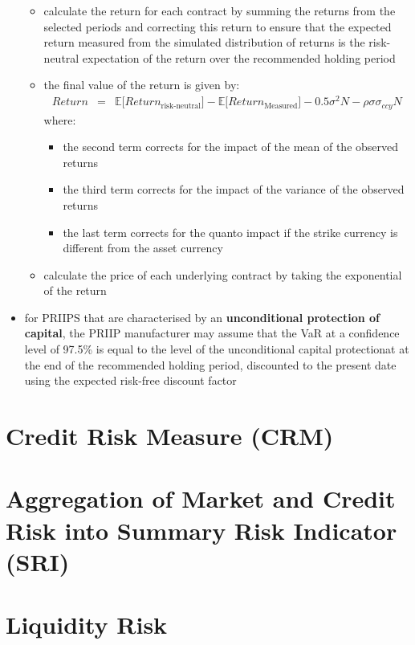 \begin{itemize}
\begin{itemize}
		\item calculate the return for each contract by summing the returns from the selected periods and correcting this return to ensure that the expected return measured from the simulated distribution of returns is the risk-neutral expectation of the return over the recommended holding period
		\item the final value of the return is given by:
		\begin{eqnarray}
		\nonumber
		Return &=& \mathbb{E}\Big[Return_{\text{risk-neutral}}\Big] - \mathbb{E}\Big[Return_{\text{Measured}}\Big] - 0.5\sigma^{2}N - \rho\sigma\sigma_{ccy}N
		\end{eqnarray}
		where:
		\begin{itemize}
			\item the second term corrects for the impact of the mean of the observed returns
			\item the third term corrects for the impact of the variance of the observed returns
			\item the last term corrects for the quanto impact if the strike currency is different from the asset currency
		\end{itemize}
		\item calculate the price of each underlying contract by taking the exponential of the return
	\end{itemize}
	\item for PRIIPS that are characterised by an \textbf{\color{blue}unconditional protection of capital}, the PRIIP manufacturer may assume that the VaR at a confidence level of 97.5\% is equal to the level of the unconditional capital protectionat at the end of the recommended holding period, discounted to the present date using the expected risk-free discount factor
\end{itemize}

\chapter{Credit Risk Measure (CRM)}

\chapter{Aggregation of Market and Credit Risk into Summary Risk Indicator (SRI)}

\chapter{Liquidity Risk}
